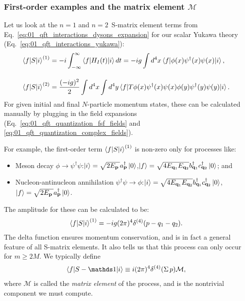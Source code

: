 \subsubsection{First-order examples and the matrix element $\mathcal M$}

Let us look at the $n = 1$ and $n = 2\,$ S-matrix element terms from Eq.~\ref{eq:01_qft_interactions_dysons_expansion} for our scalar Yukawa theory (Eq.~\ref{eq:01_qft_interactions_yukawa}):
\begin{equation}
	\label{eq:01_qft_interactions_yukawa_smatrix_terms}
	\begin{split}
		\braket{f|S|i}^{(1)} &= -i \int_{-\infty}^\infty \braket{f|H_I(t)|i}dt = -ig \int d^4x \braket{f|\phi(x)\psi^\dagger(x)\psi(x)|i}, \\[1em]
		\braket{f|S|i}^{(2)} &= \frac{(-ig)^2}{2} \int d^4x \int d^4y \braket{f|T \phi(x)\psi^\dagger(x)\psi(x)\phi(y)\psi^\dagger(y)\psi(y)|i}.
	\end{split}
\end{equation}
For given initial and final $N$-particle momentum states, these can be calculated manually by plugging in the field expansions (Eq.~\ref{eq:01_qft_quantization_fsf_fields} and \ref{eq:01_qft_quantization_complex_fields}).

For example, the first-order term $\braket{f|S|i}^{(1)}$ is non-zero only for processes like:
\begin{itemize}
	\item Meson decay $\phi \rightarrow \psi^\dagger\psi$:\quad $\ket{i} = \sqrt{2E_{\mathbf{p}}\,} a^\dagger_{\mathbf{p}} \ket{0}$,\quad $\ket{f} = \sqrt{4 E_{\mathbf{q}_1} E_{\mathbf{q}_2}} b^\dagger_{\mathbf{q}_1} c^\dagger_{\mathbf{q}_2} \ket{0}$; and
	\item Nucleon-antinucleon annihilation $\psi^\dagger\psi \rightarrow \phi$:\quad $\ket{i} = \sqrt{4 E_{\mathbf{q}_1} E_{\mathbf{q}_2}} b^\dagger_{\mathbf{q}_1} c^\dagger_{\mathbf{q}_2} \ket{0}$,\quad $\ket{f} = \sqrt{2E_{\mathbf{p}}\,} a^\dagger_{\mathbf{p}} \ket{0}$.
\end{itemize}
The amplitude for these can be calculated to be:
\begin{equation}
	\label{eq:01_qft_interactions_yukawa_smatrix_1}
	\braket{f|S|i}^{(1)} = -ig (2\pi)^4 \delta^{(4)}(p - q_1 - q_2).
\end{equation}
The delta function ensures momentum conservation, and is in fact a general feature of all S-matrix elements.
It also tells us that this process can only occur for $m \geq 2M$.
We typically define
\begin{equation}
	\label{eq:01_qft_interactions_matrix_element}
	\braket{f|S - \identity|i} \equiv i (2\pi)^4 \delta^{(4)}(\Sigma\,p) \mathcal M,
\end{equation}
where $\mathcal M$ is called the \textit{matrix element} of the process, and is the nontrivial component we must compute.

